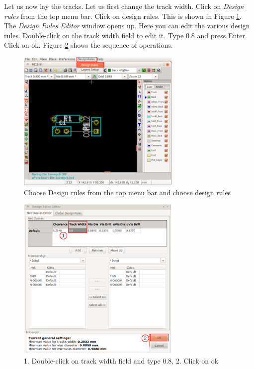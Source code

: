 Let us now lay the tracks. Let us first change the track width. Click on \textit{Design rules} from the top menu bar. Click on design rules. This is shown in Figure \ref{drules}. The \textit{Design Rules Editor} window opens up. Here you can edit the various design rules. Double-click on the track width field to edit it. Type 0.8 and press Enter. Click on ok. Figure \ref{druleedit} shows the sequence of operations. 
\begin{figure}
\centering
\includegraphics[width=0.7\textwidth]{figures/drules}
\caption{Choose Design rules from the top menu bar and choose design rules}
\label{drules}
\end{figure}
\begin{figure}
\centering
\includegraphics[width=0.7\textwidth]{figures/druleedit}
\caption{1. Double-click on track width field and type 0.8, 2. Click on ok}
\label{druleedit}
\end{figure}

